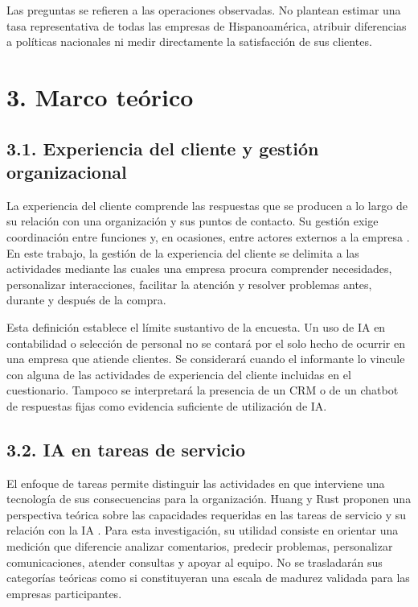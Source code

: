 \documentclass[12pt,letterpaper]{article}
\begin{document}
Las preguntas se refieren a las operaciones observadas. No plantean estimar una tasa representativa de todas las empresas de Hispanoamérica, atribuir diferencias a políticas nacionales ni medir directamente la satisfacción de sus clientes.

\section*{3. Marco teórico}
\subsection*{3.1. Experiencia del cliente y gestión organizacional}
La experiencia del cliente comprende las respuestas que se producen a lo largo de su relación con una organización y sus puntos de contacto. Su gestión exige coordinación entre funciones y, en ocasiones, entre actores externos a la empresa \citep{lemon}. En este trabajo, la gestión de la experiencia del cliente se delimita a las actividades mediante las cuales una empresa procura comprender necesidades, personalizar interacciones, facilitar la atención y resolver problemas antes, durante y después de la compra.

Esta definición establece el límite sustantivo de la encuesta. Un uso de IA en contabilidad o selección de personal no se contará por el solo hecho de ocurrir en una empresa que atiende clientes. Se considerará cuando el informante lo vincule con alguna de las actividades de experiencia del cliente incluidas en el cuestionario. Tampoco se interpretará la presencia de un CRM o de un chatbot de respuestas fijas como evidencia suficiente de utilización de IA.

\subsection*{3.2. IA en tareas de servicio}
El enfoque de tareas permite distinguir las actividades en que interviene una tecnología de sus consecuencias para la organización. Huang y Rust proponen una perspectiva teórica sobre las capacidades requeridas en las tareas de servicio y su relación con la IA \citep{huang}. Para esta investigación, su utilidad consiste en orientar una medición que diferencie analizar comentarios, predecir problemas, personalizar comunicaciones, atender consultas y apoyar al equipo. No se trasladarán sus categorías teóricas como si constituyeran una escala de madurez validada para las empresas participantes.
\end{document}

